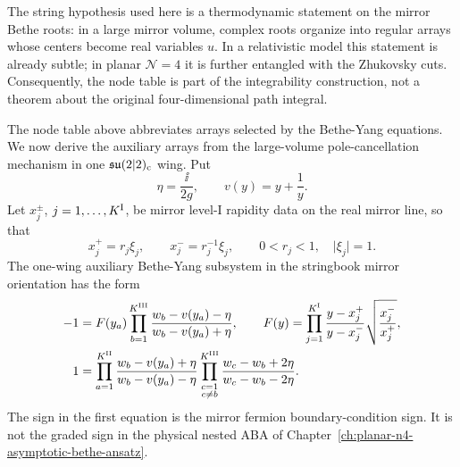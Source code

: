 The string hypothesis used here is a thermodynamic statement on the mirror
Bethe roots: in a large mirror volume, complex roots organize into regular
arrays whose centers become real variables \(u\).  In a relativistic model
this statement is already subtle; in planar \(\mathcal N=4\) it is further
entangled with the Zhukovsky cuts.  Consequently, the node table is part of
the integrability construction, not a theorem about the original
four-dimensional path integral.

The node table above abbreviates arrays selected by the Bethe-Yang
equations.  We now derive the auxiliary arrays from the large-volume
pole-cancellation mechanism in one
\(\mathfrak{su}(2|2)_{\rm c}\) wing.  Put
\[
  \eta=\frac{\ii}{2g},
  \qquad
  v(y)=y+\frac1y .
\]
Let \(x_j^\pm\), \(j=1,\ldots,K^{\rm I}\), be mirror level-I rapidity data
on the real mirror line, so that
\[
  x_j^+=r_j\xi_j,\qquad x_j^-=r_j^{-1}\xi_j,
  \qquad 0<r_j<1,\quad \lvert\xi_j\rvert=1 .
\]
The one-wing auxiliary Bethe-Yang subsystem in the stringbook mirror
orientation has the form
\begin{equation}
\begin{aligned}
  -1
  &=
  F(y_a)
  \prod_{b=1}^{K^{\rm III}}
  \frac{w_b-v(y_a)-\eta}{w_b-v(y_a)+\eta},
  \qquad
  F(y)=
  \prod_{j=1}^{K^{\rm I}}
  \frac{y-x_j^+}{y-x_j^-}
  \sqrt{\frac{x_j^-}{x_j^+}},
  \\
  1
  &=
  \prod_{a=1}^{K^{\rm II}}
  \frac{w_b-v(y_a)+\eta}{w_b-v(y_a)-\eta}
  \prod_{\substack{c=1\\c\neq b}}^{K^{\rm III}}
  \frac{w_c-w_b+2\eta}{w_c-w_b-2\eta}.
\end{aligned}
  \label{eq:planar-n4-mirror-auxiliary-bethe-yang}
\end{equation}
The sign in the first equation is the mirror fermion boundary-condition sign.
It is not the graded sign in the physical nested ABA of
Chapter~\ref{ch:planar-n4-asymptotic-bethe-ansatz}.

